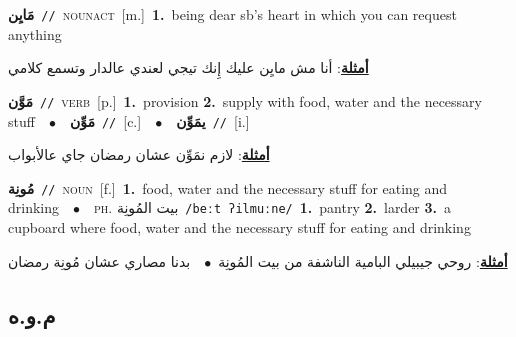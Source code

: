 \documentclass[10pt,a4paper,twoside]{article} %
\begin{document}
\begin{multicols}{2}
{\setlength\topsep{0pt}\textbf{\foreignlanguage{arabic}{مَايِن}}\ {\color{gray}\texttt{//}\color{black}}\ \textsc{noun\textunderscore act}\ [m.]\ \textbf{1.}~being dear sb's heart in which you can request anything\  \begin{flushright}\color{gray}\foreignlanguage{arabic}{\textbf{\underline{\foreignlanguage{arabic}{أمثلة}}}: أنا مش مايِن عليك إِنك تيجي لعندي عالدار وتسمع كلامي}\end{flushright}\color{black}} \vspace{2mm}

{\setlength\topsep{0pt}\textbf{\foreignlanguage{arabic}{مَوَّن}}\ {\color{gray}\texttt{//}\color{black}}\ \textsc{verb}\ [p.]\ \textbf{1.}~provision  \textbf{2.}~supply with food, water and the necessary stuff\ \ $\bullet$\ \ \setlength\topsep{0pt}\textbf{\foreignlanguage{arabic}{مَوِّن}}\ {\color{gray}\texttt{//}\color{black}}\ [c.]\ \ $\bullet$\ \ \setlength\topsep{0pt}\textbf{\foreignlanguage{arabic}{يمَوِّن}}\ {\color{gray}\texttt{//}\color{black}}\ [i.]\  \begin{flushright}\color{gray}\foreignlanguage{arabic}{\textbf{\underline{\foreignlanguage{arabic}{أمثلة}}}: لازم نمَوِّن عشان رمضان جاي عالأبواب}\end{flushright}\color{black}} \vspace{2mm}

{\setlength\topsep{0pt}\textbf{\foreignlanguage{arabic}{مُونِة}}\ {\color{gray}\texttt{//}\color{black}}\ \textsc{noun}\ [f.]\ \textbf{1.}~food, water and the necessary stuff for eating and drinking\ \ $\bullet$\ \ \textsc{ph.} \color{gray} \foreignlanguage{arabic}{بيت المُونِة}\color{black}\ {\color{gray}\texttt{/{\sffamily beːt ʔilmuːne}/}\color{black}}\ \textbf{1.}~pantry  \textbf{2.}~larder  \textbf{3.}~a cupboard where food, water and the necessary stuff for eating and drinking\  \begin{flushright}\color{gray}\foreignlanguage{arabic}{\textbf{\underline{\foreignlanguage{arabic}{أمثلة}}}: روحي جيبيلي البامية الناشفة من بيت المُونِة\ $\bullet$\ \  بدنا مصاري عشان مُونِة رمضان}\end{flushright}\color{black}} \vspace{2mm}

\vspace{-3mm}
\subsection*{\color{blue}\foreignlanguage{arabic}{م.و.ه}\color{blue}{}} 


\end{multicols}
\end{document}
